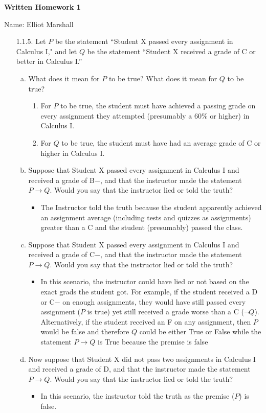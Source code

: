 \documentclass[12pt]{article}
\begin{document}
\centerline{\bf Written Homework 1}

\centerline{Name: Elliot Marshall}

\begin{itemize}
\item[1.1.5.] Let $P$ be the statement ``Student X passed every assignment in Calculus I," and let $Q$ be the statement ``Student X received a grade of C or better in Calculus I.''
\begin{enumerate}[(a)]
\item What does it mean for $P$ to be true? What does it mean for $Q$ to be true?
    \begin{enumerate}[(1)]
    \item For $P$ to be true, the student must have achieved a passing grade on every assignment they attempted (presumably a 60\% or higher) in Calculus I.
    \item For $Q$ to be true, the student must have had an average grade of C or higher in Calculus I.
    \end{enumerate}
    
\item Suppose that Student X passed every assignment in Calculus I and received a grade of B$-$, and that the instructor made the statement $P\to Q$. Would you say that the instructor lied or told the truth?
    \begin{itemize}
        \item The Instructor told the truth because the student apparently achieved an assignment average (including tests and quizzes as assignments) greater than a C and the student (presumably) passed the class.
    \end{itemize}
\item Suppose that Student X passed every assignment in Calculus I and received a grade of C$-$, and that the instructor made the statement $P\to Q$. Would you say that the instructor lied or told the truth?
    \begin{itemize}
        \item In this scenario, the instructor could have lied or not based on the exact grads the student got. For example, if the student received a D or C$-$ on enough assignments,
        they would have still passed every assignment ($P$ is true) yet still received a grade worse than a C ($\neg Q$). Alternatively, if the student received an F on any assignment, then $P$ would be false and therefore $Q$ could be either True or False while the statement $P\to Q$ is True because the premise is false
    \end{itemize}
\item Now suppose that Student X did not pass two assignments in Calculus I and received a grade of D, and that the instructor made the statement $P\to Q$. Would you say that the instructor lied or told the truth?
    \begin{itemize}
        \item In this scenario, the instructor told the truth as the premise ($P$) is false.
    \end{itemize}


\end{enumerate}
\end{itemize}
\end{document}
